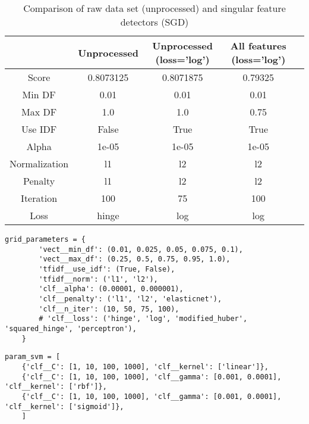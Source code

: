 \begin{table}[tbp]
	\centering
	\begin{tabular}{| c| c | c | c | c |}
		\hline
		~				& Unprocessed		& Unprocessed (loss='log')		& All features (loss='log')	\\ \hline
		Score 			& 0.8073125				& 0.8071875					& 0.79325					\\ \hline
		Min DF 			& 0.01					& 0.01						& 0.01						\\ \hline
		Max DF 			& 1.0					& 1.0						& 0.75						\\ \hline
		Use IDF			& False					& True						& True						\\ \hline
		Alpha 			& 1e-05					& 1e-05						& 1e-05						\\ \hline
		Normalization 	& l1					& l2						& l2						\\ \hline		
		Penalty 		& l1					& l2						& l2						\\ \hline
		Iteration 		& 100					& 75						& 100						\\ \hline
		Loss 			& hinge					& log						& log						\\ \hline		
	\end{tabular}
	\caption{Comparison of raw data set (unprocessed) and singular feature detectors (SGD)}
	\label{tab:unprocessed_vs_all_feature_detectors_sgd_so}
\end{table}


\begin{lstlisting}[caption={Parameters for SGD}, label={lst:param_sgd}] 
    grid_parameters = {
    	'vect__min_df': (0.01, 0.025, 0.05, 0.075, 0.1),
    	'vect__max_df': (0.25, 0.5, 0.75, 0.95, 1.0),
    	'tfidf__use_idf': (True, False),
    	'tfidf__norm': ('l1', 'l2'),
    	'clf__alpha': (0.00001, 0.000001),
    	'clf__penalty': ('l1', 'l2', 'elasticnet'),
    	'clf__n_iter': (10, 50, 75, 100),
    	# 'clf__loss': ('hinge', 'log', 'modified_huber', 'squared_hinge', 'perceptron'),
    }
\end{lstlisting}


\begin{lstlisting}[caption={Parameters for SVC}, label={lst:param_svc}] 
    param_svm = [
    {'clf__C': [1, 10, 100, 1000], 'clf__kernel': ['linear']},
    {'clf__C': [1, 10, 100, 1000], 'clf__gamma': [0.001, 0.0001], 'clf__kernel': ['rbf']},
    {'clf__C': [1, 10, 100, 1000], 'clf__gamma': [0.001, 0.0001], 'clf__kernel': ['sigmoid']},
    ]
\end{lstlisting}



